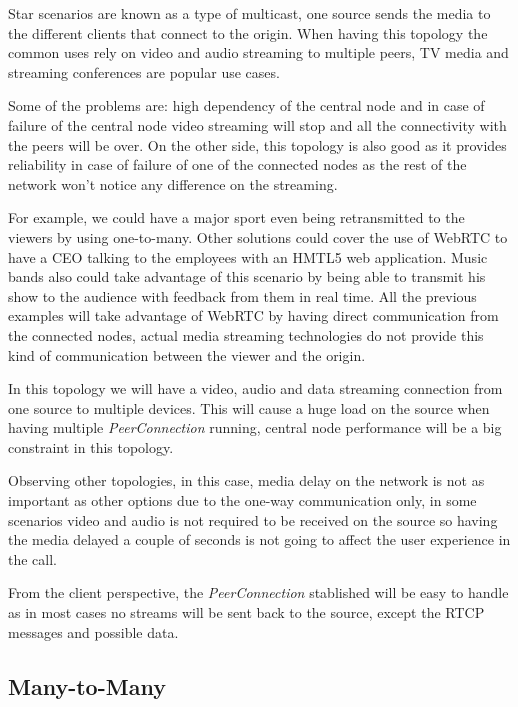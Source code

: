 Star scenarios are known as a type of multicast, one source sends the media to the different clients that connect to the origin. When having this topology the common uses rely on video and audio streaming to multiple peers, TV media and streaming conferences are popular use cases.

Some of the problems are: high dependency of the central node and in case of failure of the central node video streaming will stop and all the connectivity with the peers will be over. On the other side, this topology is also good as it provides reliability in case of failure of one of the connected nodes as the rest of the network won't notice any difference on the streaming. 

For example, we could have a major sport even being retransmitted to the viewers by using one-to-many. Other solutions could cover the use of WebRTC to have a CEO talking to the employees with an HMTL5 web application. Music bands also could take advantage of this scenario by being able to transmit his show to the audience with feedback from them in real time. All the previous examples will take advantage of WebRTC by having direct communication from the connected nodes, actual media streaming technologies do not provide this kind of communication between the viewer and the origin.

In this topology we will have a video, audio and data streaming connection from one source to multiple devices. This will cause a huge load on the source when having multiple {\it PeerConnection} running, central node performance will be a big constraint in this topology. 

Observing other topologies, in this case, media delay on the network is not as important as other options due to the one-way communication only, in some scenarios video and audio is not required to be received on the source so having the media delayed a couple of seconds is not going to affect the user experience in the call.

From the client perspective, the {\it PeerConnection} stablished will be easy to handle as  in most cases no streams will be sent back to the source, except the RTCP messages and possible data.

\subsection{Many-to-Many}

